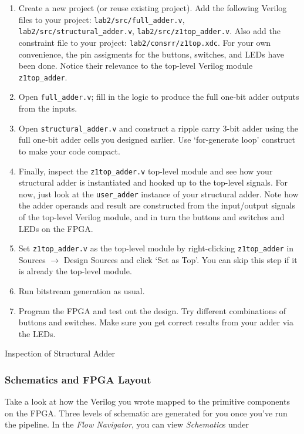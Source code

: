 \documentclass[11pt]{article}
\makeatletter
\renewcommand{\subsection}
{\@startsection {subsection}{1}{0pt}
 {-1ex}
 {0.5ex}
 {\bfseries\normalsize}}
\makeatother
\begin{document}
\begin{enumerate}
  \item Create a new project (or reuse existing project). Add the following Verilog files to your project: \verb|lab2/src/full_adder.v|, \verb|lab2/src/structural_adder.v|, \verb|lab2/src/z1top_adder.v|. Also add the constraint file to your project: \verb|lab2/consrr/z1top.xdc|. For your own convenience, the pin assigments for the buttons, switches, and LEDs have been done. Notice their relevance to the top-level Verilog module \texttt{z1top\_adder}.
  \item Open \verb|full_adder.v|; fill in the logic to produce the full one-bit adder outputs from the inputs.
  \item Open \verb|structural_adder.v| and construct a ripple carry 3-bit adder using the full one-bit adder cells you designed earlier. Use `for-generate loop' construct to make your code compact.
  \item Finally, inspect the \verb|z1top_adder.v| top-level module and see how your structural adder is instantiated and hooked up to the top-level signals. For now, just look at the \verb|user_adder| instance of your structural adder. Note how the adder operands and result are constructed from the input/output signals of the top-level Verilog module, and in turn the buttons and switches and LEDs on the FPGA.
  \item Set \verb|z1top_adder.v| as the top-level module by right-clicking \texttt{z1top\_adder} in Sources $\rightarrow$ Design Sources and click `Set as Top'. You can skip this step if it is already the top-level module.
  \item Run bitstream generation as usual.
  \item Program the FPGA and test out the design. Try different combinations of buttons and switches. Make sure you get correct results from your adder via the LEDs.
\end{enumerate}

\subsection{Inspection of Structural Adder}
\subsubsection{Schematics and FPGA Layout}
Take a look at how the Verilog you wrote mapped to the primitive components on the FPGA.
Three levels of schematic are generated for you once you've run the pipeline.
In the \emph{Flow Navigator}, you can view \emph{Schematic}s under
\end{document}

